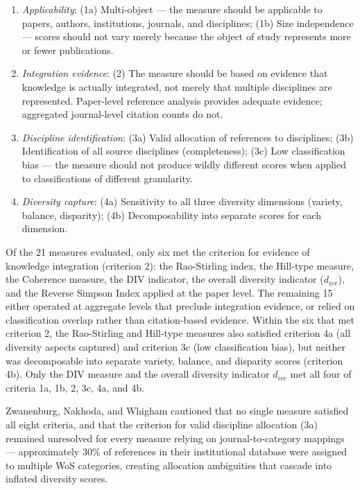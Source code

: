 \documentclass[
]{article}
\providecommand{\tightlist}{%
  \setlength{\itemsep}{0pt}\setlength{\parskip}{0pt}}
\begin{document}
\begin{enumerate}
\def\labelenumi{\arabic{enumi}.}
\tightlist
\item
  \emph{Applicability}: (1a) Multi-object --- the measure should be
  applicable to papers, authors, institutions, journals, and
  disciplines; (1b) Size independence --- scores should not vary merely
  because the object of study represents more or fewer publications.
\item
  \emph{Integration evidence}: (2) The measure should be based on
  evidence that knowledge is actually integrated, not merely that
  multiple disciplines are represented. Paper-level reference analysis
  provides adequate evidence; aggregated journal-level citation counts
  do not.
\item
  \emph{Discipline identification}: (3a) Valid allocation of references
  to disciplines; (3b) Identification of all source disciplines
  (completeness); (3c) Low classification bias --- the measure should
  not produce wildly different scores when applied to classifications of
  different granularity.
\item
  \emph{Diversity capture}: (4a) Sensitivity to all three diversity
  dimensions (variety, balance, disparity); (4b) Decomposability into
  separate scores for each dimension.
\end{enumerate}

Of the 21 measures evaluated, only six met the criterion for evidence of
knowledge integration (criterion 2): the Rao-Stirling index, the
Hill-type measure, the Coherence measure, the DIV indicator, the overall
diversity indicator (\(d_{ive}\)), and the Reverse Simpson Index applied
at the paper level. The remaining 15 either operated at aggregate levels
that preclude integration evidence, or relied on classification overlap
rather than citation-based evidence. Within the six that met criterion
2, the Rao-Stirling and Hill-type measures also satisfied criterion 4a
(all diversity aspects captured) and criterion 3c (low classification
bias), but neither was decomposable into separate variety, balance, and
disparity scores (criterion 4b). Only the DIV measure and the overall
diversity indicator \(d_{ive}\) met all four of criteria 1a, 1b, 2, 3c,
4a, and 4b.

Zwanenburg, Nakhoda, and Whigham cautioned that no single measure
satisfied all eight criteria, and that the criterion for valid
discipline allocation (3a) remained unresolved for every measure relying
on journal-to-category mappings --- approximately 30\% of references in
their institutional database were assigned to multiple WoS categories,
creating allocation ambiguities that cascade into inflated diversity
scores.
\end{document}
